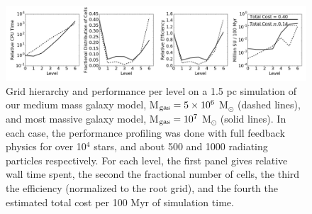 \documentclass[11pt]{article}
\begin{document}

\begin{figure}
\centering
\includegraphics[width=.9\linewidth]{enzo_levels}
\caption{\small 
Grid hierarchy and performance per level on a 1.5 pc simulation of our medium mass galaxy model, M$_{\rm gas} = 5 \times 10^{6}$ M$_{\odot}$ (dashed lines), and most massive galaxy model, M$_{\rm gas} = 10^{7}$ M$_{\odot}$ (solid lines). In each case, the performance profiling was done with full feedback physics for over 10$^{4}$ stars, and about 500 and 1000 radiating particles respectively. For each level, the first panel gives relative wall time spent, the second the fractional number of cells, the third the efficiency (normalized to the root grid), and the fourth the estimated total cost per 100 Myr of simulation time.}
\label{fig:levels}
\end{figure}
\end{document}

